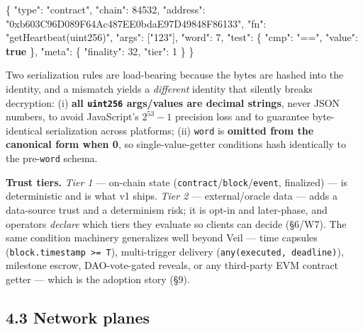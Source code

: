\documentclass[
  11pt,
]{article}
\newenvironment{Shaded}{}{}
\newcommand{\DataTypeTok}[1]{\textcolor[rgb]{0.56,0.13,0.00}{#1}}
\newcommand{\DecValTok}[1]{\textcolor[rgb]{0.25,0.63,0.44}{#1}}
\newcommand{\FunctionTok}[1]{\textcolor[rgb]{0.02,0.16,0.49}{#1}}
\newcommand{\KeywordTok}[1]{\textcolor[rgb]{0.00,0.44,0.13}{\textbf{#1}}}
\newcommand{\OtherTok}[1]{\textcolor[rgb]{0.00,0.44,0.13}{#1}}
\newcommand{\StringTok}[1]{\textcolor[rgb]{0.25,0.44,0.63}{#1}}
\begin{document}
\begin{Shaded}
\begin{Highlighting}[]
\FunctionTok{\{}
  \DataTypeTok{"type"}\FunctionTok{:} \StringTok{"contract"}\FunctionTok{,} \DataTypeTok{"chain"}\FunctionTok{:} \DecValTok{84532}\FunctionTok{,}
  \DataTypeTok{"address"}\FunctionTok{:} \StringTok{"0xb603C96D089F64Ac487EE0bdaE97D49848F86133"}\FunctionTok{,}
  \DataTypeTok{"fn"}\FunctionTok{:} \StringTok{"getHeartbeat(uint256)"}\FunctionTok{,} \DataTypeTok{"args"}\FunctionTok{:} \OtherTok{[}\StringTok{"123"}\OtherTok{]}\FunctionTok{,} \DataTypeTok{"word"}\FunctionTok{:} \DecValTok{7}\FunctionTok{,}
  \DataTypeTok{"test"}\FunctionTok{:} \FunctionTok{\{} \DataTypeTok{"cmp"}\FunctionTok{:} \StringTok{"=="}\FunctionTok{,} \DataTypeTok{"value"}\FunctionTok{:} \KeywordTok{true} \FunctionTok{\},}
  \DataTypeTok{"meta"}\FunctionTok{:} \FunctionTok{\{} \DataTypeTok{"finality"}\FunctionTok{:} \DecValTok{32}\FunctionTok{,} \DataTypeTok{"tier"}\FunctionTok{:} \DecValTok{1} \FunctionTok{\}}
\FunctionTok{\}}
\end{Highlighting}
\end{Shaded}

Two serialization rules are load-bearing because the bytes are hashed
into the identity, and a mismatch yields a \emph{different} identity
that silently breaks decryption: (i) \textbf{all \texttt{uint256}
args/values are decimal strings}, never JSON numbers, to avoid
JavaScript's \(2^{53}-1\) precision loss and to guarantee byte-identical
serialization across platforms; (ii) \texttt{word} is \textbf{omitted
from the canonical form when 0}, so single-value-getter conditions hash
identically to the pre-\texttt{word} schema.

\textbf{Trust tiers.} \emph{Tier 1} --- on-chain state
(\texttt{contract}/\texttt{block}/\texttt{event}, finalized) --- is
deterministic and is what v1 ships. \emph{Tier 2} --- external/oracle
data --- adds a data-source trust and a determinism risk; it is opt-in
and later-phase, and operators \emph{declare} which tiers they evaluate
so clients can decide (§6/W7). The same condition machinery generalizes
well beyond Veil --- time capsules
(\texttt{block.timestamp\ \textgreater{}=\ T}), multi-trigger delivery
(\texttt{any(executed,\ deadline)}), milestone escrow, DAO-vote-gated
reveals, or any third-party EVM contract getter --- which is the
adoption story (§9).

\subsection{4.3 Network planes}\label{network-planes}
\end{document}
